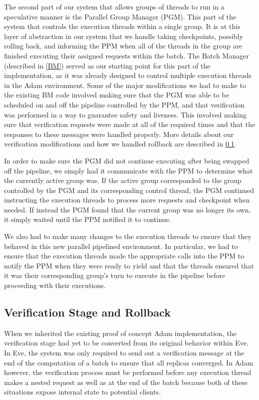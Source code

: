 \documentclass[11pt, oneside]{report}
\begin{document}
The second part of our system that allows groups of threads to run in a speculative manner is the Parallel Group Manager (PGM). This part of the system that controls the execution threads within a single group.
It is at this layer of abstraction in our system that we handle taking checkpoints, possibly rolling back, and informing the PPM when all of the threads in the group are finished executing their assigned requests within the batch.
The Batch Manager (described in \ref{BM}) served as our starting point for this part of the implementation, as it was already designed to control multiple execution threads in the Adam environment.
Some of the major modifications we had to make to the existing BM code involved making sure that the PGM was able to be scheduled on and off the pipeline controlled by the PPM, and that verification was performed in a way to guarantee safety and liveness. 
This involved making sure that verification requests were made at all of the required times and that the responses to these messages were handled properly. 
More details about our verification modifications and how we handled rollback are described in \ref{Verification}. 

In order to make sure the PGM did not continue executing after being swapped off the pipeline, we simply had it communicate with the PPM to determine what the currently active group was. 
If the active group corresponded to the group controlled by the PGM and its corresponding control thread, the PGM continued instructing the execution threads to process more requests and checkpoint when needed. 
If instead the PGM found that the current group was no longer its own, it simply waited until the PPM notified it to continue.

We also had to make many changes to the execution threads to ensure that they behaved in this new parallel pipelined environment.
In particular, we had to ensure that the execution threads made the appropriate calls into the PPM to notify the PPM when they were ready to yield and that the threads ensured that it was their corresponding group's turn to execute in the pipeline before proceeding with their executions.

\subsection{Verification Stage and Rollback}\label{Verification}

When we inherited the existing proof of concept Adam implementation, the verification stage had yet to be converted from its original behavior within Eve.
In Eve, the system was only required to send out a verification message at the end of the computation of a batch to ensure that all replicas converged.
In Adam however, the verification process must be performed before any execution thread makes a nested request as well as at the end of the batch because both of these situations expose internal state to potential clients.
\end{document}
